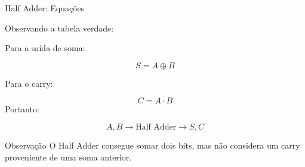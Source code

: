 \begin{frame}{Half Adder: Equações}

    Observando a tabela verdade:

    \vspace{0.4cm}

    Para a saída de soma:

    \[
        \boxed{S=A\oplus B}
    \]

    Para o carry:

    \[
        \boxed{C=A\cdot B}
    \]
    Portanto:

    \[
        A,B
        \longrightarrow
        \boxed{\text{Half Adder}}
        \longrightarrow
        S,C
    \]

    \begin{alertblock}{Observação}
        O Half Adder consegue somar dois bits, mas não considera
        um carry proveniente de uma soma anterior.
    \end{alertblock}

\end{frame}